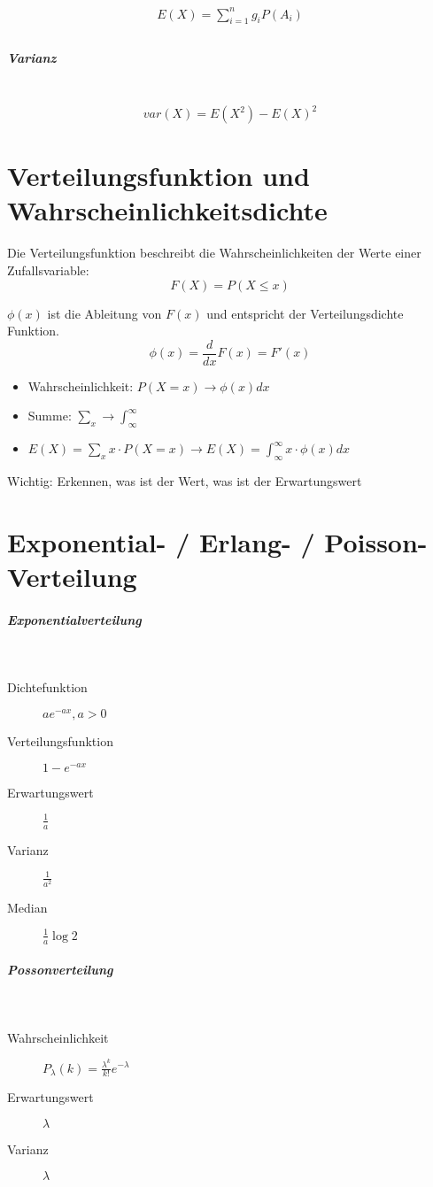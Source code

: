 \documentclass[10pt,twoside,landscape]{article}
\begin{document}
\begin{multicols}{2}
\begin{equation}
\begin{split} \label{eqn:erwartungs-wert}
E(X) = \sum_{i=1}^{n}g_iP(A_i) \\
\end{split} 
\end{equation}
\subparagraph{Varianz} \
\label{sec:org8500b31}
\[
var(X) = E(X^2) - E(X)^2
\]
\section{Verteilungsfunktion und Wahrscheinlichkeitsdichte}
\label{sec:orgd83c9ac}
Die Verteilungsfunktion beschreibt die Wahrscheinlichkeiten der Werte einer Zufallsvariable:
\[
F(X) = P(X \le x)
\]

\(\phi(x)\) ist die Ableitung von \(F(x)\) und entspricht der Verteilungsdichte Funktion.
\[
\phi(x) = \frac{d}{dx}F(x) = F'(x)
\]

\begin{itemize}
\item Wahrscheinlichkeit: \(P(X = x) \rightarrow \phi(x) dx\)
\item Summe: \(\sum_x \rightarrow \int_\infty^\infty\)
\item \(E(X) = \sum_x x \cdot P(X = x) \rightarrow E(X) = \int_\infty^\infty x \cdot \phi(x) dx\)
\end{itemize}
Wichtig: Erkennen, was ist der Wert, was ist der Erwartungswert
\section{Exponential- / Erlang- / Poisson-Verteilung}
\label{sec:orga51bab2}
\subparagraph{Exponentialverteilung} \
\label{sec:orgeafa2f6}
\begin{description}
\item[{Dichtefunktion}] \(ae^{-ax}, a > 0\)
\item[{Verteilungsfunktion}] \(1 - e^{-ax}\)
\item[{Erwartungswert}] \(\frac{1}{a}\)
\item[{Varianz}] \(\frac{1}{a^2}\)
\item[{Median}] \(\frac{1}{a}\log{2}\)
\end{description}
\subparagraph{Possonverteilung} \
\label{sec:orgd0ac840}
\begin{description}
\item[{Wahrscheinlichkeit}] \(P_\lambda(k) = \frac{\lambda^k}{k!}e^{-\lambda}\)
\item[{Erwartungswert}] \(\lambda\)
\item[{Varianz}] \(\lambda\)
\end{description}

\end{multicols}
\end{document}
